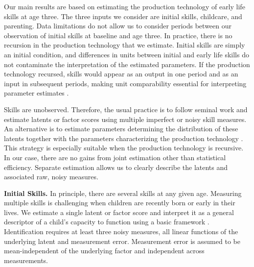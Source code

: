 \noindent Our main results are based on estimating the production technology of early life skills at age three. The three inputs we consider are initial skills, childcare, and parenting. Data limitations do not allow us to consider periods between our observation of initial skills at baseline and age three. In practice, there is no recursion in the production technology that we estimate. Initial skills are simply an initial condition, and differences in units between initial and early life skills do not contaminate the interpretation of the estimated parameters. If the production technology recursed, skills would appear as an output in one period and as an input in subsequent periods, making unit comparability essential for interpreting parameter estimates \citep{freybergerNormalizationsMisspecificationSkill2022,agostinelliIdentificationDynamicLatent2016}. 

Skills are unobserved. Therefore, the usual practice is to follow seminal work \citep[i.e.,][]{cunhaEstimatingTechnologyCognitive2010a,cunhaFormulatingIdentifyingEstimating2008a} and estimate latents or factor scores using multiple imperfect or noisy skill measures. An alternative is to estimate parameters determining the distribution of these latents together with the parameters characterizing the production technology \citep[e.g.,][]{cunhaEstimatingTechnologyCognitive2010a,agostinelliEstimatingTechnologyChildren2016a}. This strategy is especially suitable when the production technology is recursive. In our case, there are no gains from joint estimation other than statistical efficiency. Separate estimation allows us to clearly describe the latents and associated raw, noisy measures. 

\noindent \textbf{Initial Skills.} In principle, there are several skills at any given age. Measuring multiple skills is challenging when children are recently born or early in their lives. We estimate a single latent or factor score and interpret it as a general descriptor of a child's capacity to function using a basic framework \citep[e.g.,][]{williamsIdentificationLinearFactor2020}. Identification requires at least three noisy measures, all linear functions of the underlying latent and measurement error. Measurement error is assumed to be mean-independent of the underlying factor and independent across measurements. 

